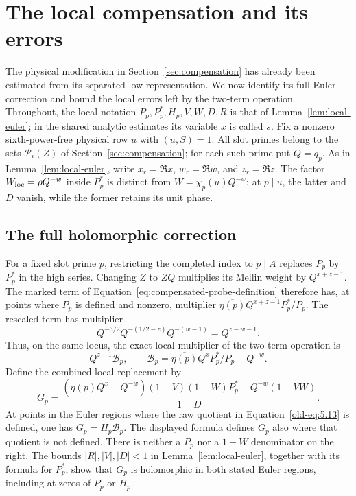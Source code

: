\documentclass[11pt,a4paper]{article}
\numberwithin{equation}{section}
\numberwithin{figure}{section}
\theoremstyle{definition}
\theoremstyle{remark}
\begin{document}
\section{The local compensation and its errors}
\label{sec:local-compensation}

The physical modification in Section~\ref{sec:compensation} has already
been estimated from its separated low representation.  We now identify its
full Euler correction and bound the local errors left by the two-term
operation.  Throughout, the local notation $P_p,P_p^*,H_p,V,W,D,R$ is that
of Lemma~\ref{lem:local-euler}; in the shared analytic estimates its variable
$x$ is called $s$.  Fix a nonzero sixth-power-free physical row $u$ with
$(u,S)=1$.  All slot primes belong to the sets $\mathcal P_i(Z)$ of
Section~\ref{sec:compensation}; for each such prime put $Q=q_p$.  As in
Lemma~\ref{lem:local-euler}, write $x_r=\Re x$, $w_r=\Re w$, and $z_r=\Re z$.
The factor $W_{\rm loc}=\rho Q^{-w}$ inside $P_p^*$ is distinct from
$W=\chi_p(u)Q^{-w}$: at $p\mid u$, the latter and $D$ vanish, while the
former retains its unit phase.

\subsection{The full holomorphic correction}

For a fixed slot prime $p$, restricting the completed index to
$p\mid A$ replaces $P_p$ by $P_p^*$ in the high series.  Changing
$Z$ to $ZQ$ multiplies its Mellin weight by $Q^{x+z-1}$.  The
marked term of Equation~\eqref{eq:compensated-probe-definition}
therefore has, at points where $P_p$ is defined and nonzero, multiplier
$\overline{\eta(p)}Q^{x+z-1}P_p^*/P_p$.  The rescaled term has
multiplier
\[
 Q^{-3/2}Q^{-(1/2-z)}Q^{-(w-1)}=Q^{z-w-1}.
\]
Thus, on the same locus, the exact local multiplier of the two-term operation is
\begin{equation}\label{old-eq:5.13}
 Q^{z-1}\mathcal B_p,\qquad
 \mathcal B_p=\overline{\eta(p)}Q^xP_p^*/P_p-Q^{-w}.
\end{equation}
Define the combined local replacement by
\begin{equation}\label{old-eq:5.13c}
 G_p=
 \frac{(\overline{\eta(p)}Q^x-Q^{-w})(1-V)(1-W)P_p^*
       -Q^{-w}(1-VW)}{1-D}.
\end{equation}
At points in the Euler regions where the raw quotient in
Equation~\eqref{old-eq:5.13} is defined, one has $G_p=H_p\mathcal B_p$.
The displayed formula defines
$G_p$ also where that quotient is not defined.  There is neither a $P_p$
nor a $1-W$ denominator on the right.  The bounds $|R|,|V|,|D|<1$ in
Lemma~\ref{lem:local-euler}, together with its formula for $P_p^*$, show
that $G_p$ is holomorphic in both stated Euler regions, including at zeros
of $P_p$ or $H_p$.
\end{document}
